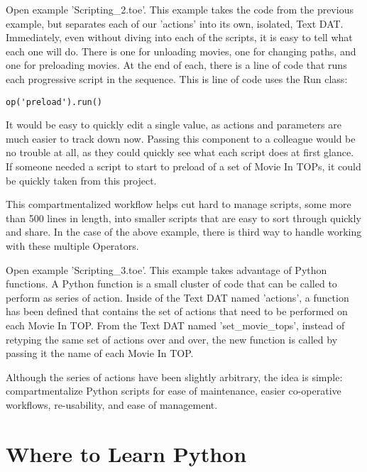 \begin{fullwidth}
Open example 'Scripting\_2.toe'. This example takes the code from the previous example, but separates each of our 'actions' into its own, isolated, Text DAT. Immediately, even without diving into each of the scripts, it is easy to tell what each one will do. There is one for unloading movies, one for changing paths, and one for preloading movies. At the end of each, there is a line of code that runs each progressive script in the sequence. This is line of code uses the Run class:

\begin{lstlisting}
op('preload').run()
\end{lstlisting}

It would be easy to quickly edit a single value, as actions and parameters are much easier to track down now. Passing this component to a colleague would be no trouble at all, as they could quickly see what each script does at first glance. If someone needed a script to start to preload of a set of Movie In TOPs, it could be quickly taken from this project. 

This compartmentalized workflow helps cut hard to manage scripts, some more than 500 lines in length, into smaller scripts that are easy to sort through quickly and share. In the case of the above example, there is third way to handle working with these multiple Operators.

Open example 'Scripting\_3.toe'. This example takes advantage of Python functions. A Python function is a small cluster of code that can be called to perform as series of action. Inside of the Text DAT named 'actions', a function has been defined that contains the set of actions that need to be performed on each Movie In TOP. From the Text DAT named 'set\_movie\_tops', instead of retyping the same set of actions over and over, the new function is called by passing it the name of each Movie In TOP.

Although the series of actions have been slightly arbitrary, the idea is simple: compartmentalize Python scripts for ease of maintenance, easier co-operative workflows, re-usability, and ease of management.

\end{fullwidth}


\section{Where to Learn Python}

